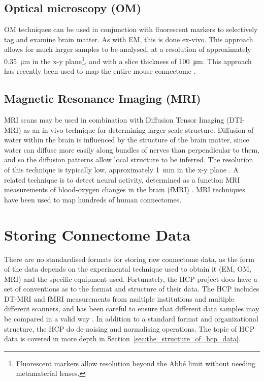 \documentclass[MSc,paper=a4,pagesize=auto]{icldt}
\begin{document}
\subsection{Optical microscopy (OM)} 
OM techniques can be used in conjunction with fluorescent markers to selectively tag and examine brain matter. As with EM, this is done ex-vivo. This approach allows for much larger samples to be analysed, at a resolution of approximately \SI{0.35}{\um} in the x-y plane\footnote{Fluorescent markers allow resolution beyond the Abbé limit without needing metamaterial lenses.}, and with a slice thickness of \SI{100}{\um}. This approach has recently been used to map the entire mouse connectome \cite{Oh2014}. 

\subsection{Magnetic Resonance Imaging (MRI)} 
MRI scans may be used in combination with Diffusion Tensor Imaging (DTI-MRI) as an in-vivo technique for determining larger scale structure. Diffusion of water within the brain is influenced by the structure of the brain matter, since water can diffuse more easily along bundles of nerves than perpendicular to them, and so the diffusion patterns allow local structure to be inferred. The resolution of this technique is typically low, approximately \SI{1}{\mm} in the x-y plane \cite{Westin2002}. A related technique is to detect neural activity, determined as a function MRI measurements of blood-oxygen changes in the brain (fMRI) \cite{Huettel2004}. MRI techniques have been used to map hundreds of human connectomes. 


\section{Storing Connectome Data}
There are no standardised formats for storing raw connectome data, as the form of the data depends on the experimental technique used to obtain it (EM, OM, MRI) and the specific equipment used. Fortunately, the HCP project does have a set of conventions as to the format and structure of their data. The HCP includes DT-MRI and fMRI measurements from multiple institutions and multiple different scanners, and has been careful to ensure that different data samples may be compared in a valid way \cite{HCP_Logistics_2014}.  In addition to a standard format and organizational structure, the HCP do de-noising and normalising operations. The topic of HCP data is covered in more depth in Section~\ref{sec:the_structure_of_hcp_data}.
\end{document}
